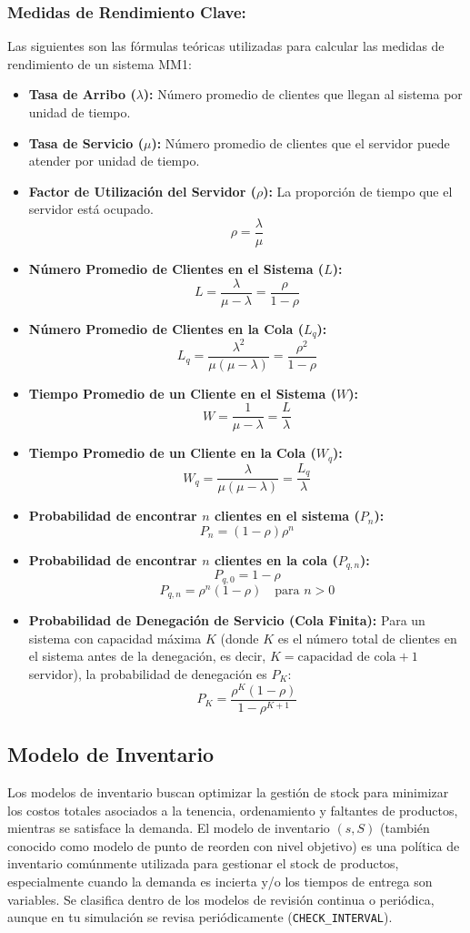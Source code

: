 \documentclass{article}
\begin{document}
\subsubsection*{Medidas de Rendimiento Clave:}
Las siguientes son las fórmulas teóricas utilizadas para calcular las medidas de rendimiento de un sistema MM1:
\begin{itemize}
    \item \textbf{Tasa de Arribo ($\lambda$):} Número promedio de clientes que llegan al sistema por unidad de tiempo.
    \item \textbf{Tasa de Servicio ($\mu$):} Número promedio de clientes que el servidor puede atender por unidad de tiempo.
    \item \textbf{Factor de Utilización del Servidor ($\rho$):} La proporción de tiempo que el servidor está ocupado.
    $$ \rho = \frac{\lambda}{\mu} $$
    \item \textbf{Número Promedio de Clientes en el Sistema ($L$):}
    $$ L = \frac{\lambda}{\mu - \lambda} = \frac{\rho}{1 - \rho} $$
    \item \textbf{Número Promedio de Clientes en la Cola ($L_q$):}
    $$ L_q = \frac{\lambda^2}{\mu(\mu - \lambda)} = \frac{\rho^2}{1 - \rho} $$
    \item \textbf{Tiempo Promedio de un Cliente en el Sistema ($W$):}
    $$ W = \frac{1}{\mu - \lambda} = \frac{L}{\lambda} $$
    \item \textbf{Tiempo Promedio de un Cliente en la Cola ($W_q$):}
    $$ W_q = \frac{\lambda}{\mu(\mu - \lambda)} = \frac{L_q}{\lambda} $$
    \item \textbf{Probabilidad de encontrar $n$ clientes en el sistema ($P_n$):}
    $$ P_n = (1 - \rho)\rho^n $$
    \item \textbf{Probabilidad de encontrar $n$ clientes en la cola ($P_{q,n}$):}
    $$ P_{q,0} = 1 - \rho $$
    $$ P_{q,n} = \rho^n (1 - \rho) \quad \text{para } n > 0 $$
    \item \textbf{Probabilidad de Denegación de Servicio (Cola Finita):} Para un sistema con capacidad máxima $K$ (donde $K$ es el número total de clientes en el sistema antes de la denegación, es decir, $K = \text{capacidad de cola} + 1$ servidor), la probabilidad de denegación es $P_K$:
    $$ P_K = \frac{\rho^K(1-\rho)}{1-\rho^{K+1}} $$
\end{itemize}


\subsection{Modelo de Inventario}
Los modelos de inventario buscan optimizar la gestión de stock para minimizar los costos totales asociados a la tenencia, ordenamiento y faltantes de productos, mientras se satisface la demanda.
El modelo de inventario \textbf{$(s,S)$} (también conocido como modelo de punto de reorden con nivel objetivo) es una política de inventario comúnmente utilizada para gestionar el stock de productos, especialmente cuando la demanda es incierta y/o los tiempos de entrega son variables. Se clasifica dentro de los modelos de revisión continua o periódica, aunque en tu simulación se revisa periódicamente (\texttt{CHECK\_INTERVAL}).
\end{document}
